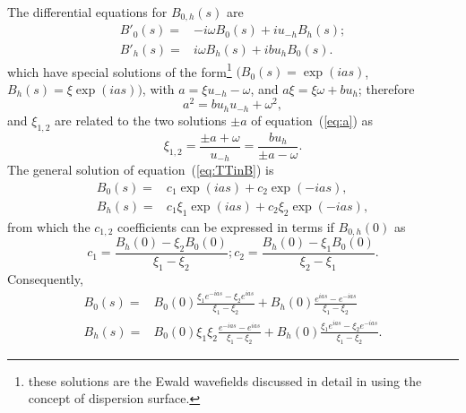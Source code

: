 \documentclass[preprint]{iucr}              %
\begin{document}
The differential equations for $B_{0,h}(s)$ are 
\begin{subequations}
\label{eq:TTinB}
\begin{align}
B'_0(s) =& -i \omega B_0(s) + i u_{-h} B_h(s); \\
B'_h(s) =& i \omega B_h(s) + i b u_{h} B_0(s).
\end{align}
\end{subequations}
which have special solutions of the form\footnote{these solutions are the Ewald wavefields discussed in detail in \cite{authierbook} using the concept of dispersion surface.} $(B_0(s)=\exp(i a s)$, $B_h(s)=\xi \exp(i a s))$, with $a = \xi u_{-h} -\omega$, and $a \xi=\xi \omega+b u_h$; therefore
\begin{equation}\label{eq:a}
    a^2=b u_h u_{-h}+\omega^2,
\end{equation}
and $\xi_{1,2}$ are related to the two solutions $\pm a$ of equation~(\ref{eq:a}) as 
\begin{equation}\label{eq:xis}
\xi_{1,2}= \frac{\pm a + \omega }{u_{-h}}=\frac{b u_h}{\pm a-\omega}.    
\end{equation}
The general solution of equation~(\ref{eq:TTinB}) is
\begin{subequations}
\label{eq:BSolutions}
\begin{align}
B_0(s) = &c_1 \exp(i a s) + c_2 \exp(-i a s), \\
B_h(s) = &c_1 \xi_1 \exp(i a s) + c_2 \xi_2 \exp(-i a s),
\end{align}
\end{subequations}
from which the $c_{1,2}$ coefficients can be expressed in terms if $B_{0,h}(0)$ as
\begin{equation}
\label{eq:cs}
c_1=\frac{B_h(0)-\xi_2 B_0(0)}{\xi_1-\xi_2};
c_2=\frac{B_h(0)-\xi_1 B_0(0)}{\xi_2-\xi_1}. \nonumber
\end{equation}
Consequently, 
\begin{subequations}
\label{eq:preBSolutions}
\begin{align}
B_0(s) = &B_0(0) \frac{\xi_1 e^{-ias} - \xi_2 e^{ias}}{\xi_1-\xi_2} + 
    B_h(0) \frac{e^{ias} - e^{-ias}}{\xi_1-\xi_2} \\
B_h(s) = &B_0(0) \xi_1\xi_2 \frac{e^{-ias} - e^{ias}}{\xi_1-\xi_2} + 
    B_h(0) \frac{\xi_1 e^{ias} - \xi_2 e^{-ias}}{\xi_1-\xi_2}.
\end{align}
\end{subequations}
\end{document}
